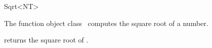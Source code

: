 \begin{ccRefFunctionObjectClass}{Sqrt<NT>}

\ccDefinition

The function object class \ccRefName\ computes the square root of a number.


\ccIsModel
{}

{returns the square root of .}

\end{ccRefFunctionObjectClass}

